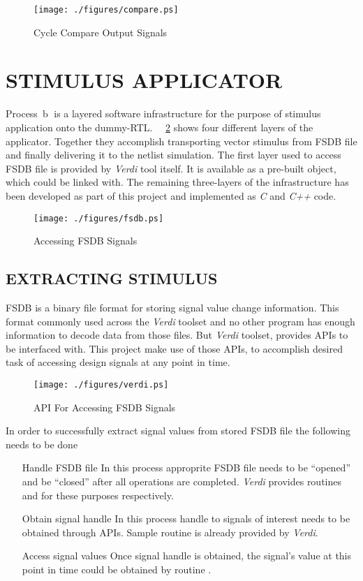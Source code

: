\begin{figure}[h]
\centering
\texttt{[image: ./figures/compare.ps]}
\caption{Cycle Compare Output Signals}
\label{fig:compare.ps}
\end{figure}


\section{STIMULUS APPLICATOR}
\label{sec:dualsim:sa}
Process~\textcircled{b} is a layered software infrastructure for the purpose of stimulus application onto the dummy-RTL. ~\figurename{~\ref{fig:fsdb.ps}} shows four different layers of the applicator. Together they accomplish transporting vector stimulus from FSDB file and finally delivering it to the netlist simulation. The first layer used to access FSDB file is provided by {\it Verdi} tool itself. It is available as a pre-built object\cite{Verdi:FsdbReader}, which could be linked with. The remaining three-layers of the infrastructure has been developed as part of this project and implemented as {\it C} and {\it C++} code.

\begin{figure}[h]
\centering
\texttt{[image: ./figures/fsdb.ps]}
\caption{Accessing FSDB Signals}
\label{fig:fsdb.ps}
\end{figure}

\subsection{EXTRACTING STIMULUS}
FSDB is a binary file format for storing signal value change information. This format commonly used across the {\it Verdi} toolset and no other program has enough information to decode data from those files. But {\it Verdi} toolset, provides APIs\cite{Verdi:FsdbReader}  to be interfaced with. This project make use of those APIs, to accomplish desired task of accessing design signals at any point in time.

\begin{figure}[h]
\centering
\texttt{[image: ./figures/verdi.ps]}
\caption{API For Accessing FSDB Signals}
\label{fig:verdi.eps}
\end{figure}

In order to successfully extract signal values from stored FSDB file the following needs to be done
\begin{enumerate}
\item[Handle FSDB file] In this process approprite FSDB file needs to be ``opened'' and be ``closed'' after all operations are completed. {\it Verdi} provides routines  and  for these purposes respectively.
\item[Obtain signal handle] In this process handle to signals of interest needs to be obtained through APIs. Sample routine \cite[p.~3]{Verdi:FsdbReader} is already provided by {\it Verdi}.
\item[Access signal values] Once signal handle is obtained, the signal's value at this point in time could be obtained by routine .
\end{enumerate}

